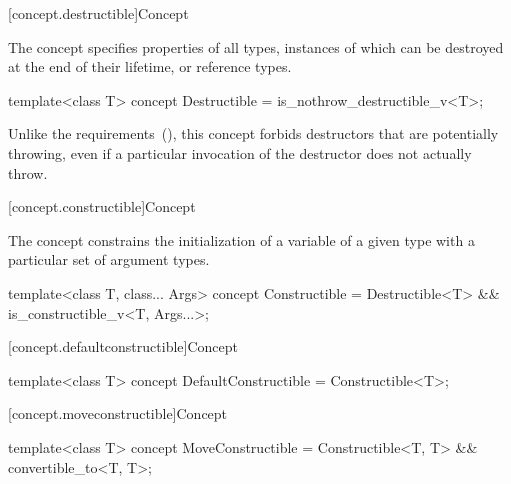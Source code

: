 [concept.destructible]{Concept }

\pnum
The  concept specifies properties of all types,
instances of which can be destroyed at the end of their lifetime, or reference
types.

%
\begin{itemdecl}
template<class T>
  concept Destructible = is_nothrow_destructible_v<T>;
\end{itemdecl}

\begin{itemdescr}
\pnum
\begin{note}
Unlike the  requirements~(), this
concept forbids destructors that are potentially throwing, even if a particular
invocation of the destructor does not actually throw.
\end{note}
\end{itemdescr}

[concept.constructible]{Concept }

\pnum
The  concept constrains the initialization of a
variable of a given type with a particular set of argument types.

%
\begin{itemdecl}
template<class T, class... Args>
  concept Constructible = Destructible<T> && is_constructible_v<T, Args...>;
\end{itemdecl}

[concept.defaultconstructible]{Concept }

%
\begin{itemdecl}
template<class T>
  concept DefaultConstructible = Constructible<T>;
\end{itemdecl}

[concept.moveconstructible]{Concept }

%
\begin{itemdecl}
template<class T>
  concept MoveConstructible = Constructible<T, T> && convertible_to<T, T>;
\end{itemdecl}

